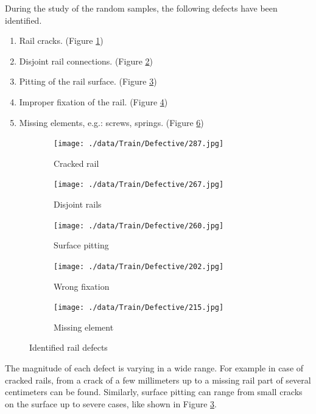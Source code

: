 \documentclass[10pt, final]{article}
\begin{document}
			During the study of the random samples, the following defects have been identified.
			\begin{enumerate}
				\item Rail cracks. (Figure \ref{fig:def_cracked})
				\item Disjoint rail connections. (Figure \ref{fig:def_disjoint})
				\item Pitting of the rail surface. (Figure \ref{fig:def_pitting})
				\item Improper fixation of the rail. (Figure \ref{fig:def_nofix})
				\item Missing elements, e.g.: screws, springs. (Figure \ref{fig:def_missing})
			\end{enumerate}
			\begin{figure}[!ht]
				\centering
				\begin{subfigure}{0.3\textwidth}
					\centering
					\texttt{[image: ./data/Train/Defective/287.jpg]}
					\caption{Cracked rail}
					\label{fig:def_cracked}
				\end{subfigure}
				\begin{subfigure}{0.3\textwidth}
					\centering
					\texttt{[image: ./data/Train/Defective/267.jpg]}
					\caption{Disjoint rails}
					\label{fig:def_disjoint}
				\end{subfigure}
				\begin{subfigure}{0.3\textwidth}
					\centering
					\texttt{[image: ./data/Train/Defective/260.jpg]}
					\caption{Surface pitting}
					\label{fig:def_pitting}
				\end{subfigure}
				\begin{subfigure}{0.3\textwidth}
					\centering
					\texttt{[image: ./data/Train/Defective/202.jpg]}
					\caption{Wrong fixation}
					\label{fig:def_nofix}
				\end{subfigure}
				\begin{subfigure}{0.3\textwidth}
					\centering
					\texttt{[image: ./data/Train/Defective/215.jpg]}
					\caption{Missing element}
					\label{fig:def_missing}
				\end{subfigure}
				\caption{Identified rail defects}
			\end{figure}
			The magnitude of each defect is varying in a wide range. 
			For example in case of cracked rails, from a crack of a few millimeters up to a missing rail part of several
			centimeters can be found.
			Similarly, surface pitting can range from small cracks on the surface up to severe cases, like shown in
			Figure \ref{fig:def_pitting}.
\end{document}
